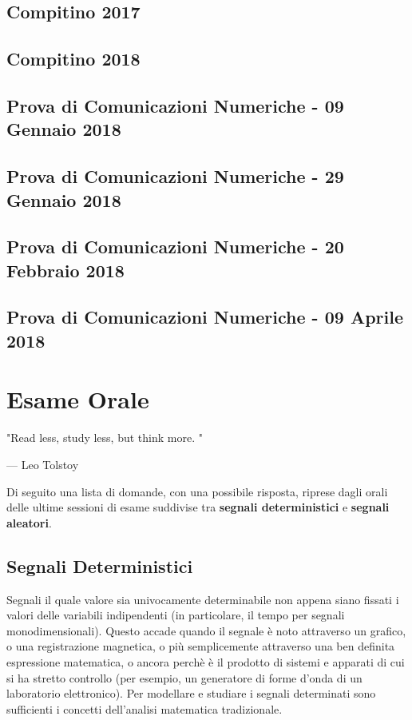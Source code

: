 \documentclass[12pt,oneside,openany]{memoir}
\numberwithin{equation}{subsection}
\begin{document}
\newpage
\section{Compitino 2017}

\newpage
\section{Compitino 2018}

\newpage
\section{Prova di Comunicazioni Numeriche - 09 Gennaio 2018}

\newpage
\section{Prova di Comunicazioni Numeriche - 29 Gennaio 2018}

\newpage
\section{Prova di Comunicazioni Numeriche - 20 Febbraio 2018}

\newpage
\section{Prova di Comunicazioni Numeriche - 09 Aprile 2018}


\chapter{Esame Orale}
\epigraph{"Read less, study less, but think more.	"}{--- \textup{Leo Tolstoy}}

Di seguito una lista di domande, con una possibile risposta, riprese dagli orali delle ultime sessioni di esame suddivise tra \textbf{segnali deterministici} e \textbf{segnali aleatori}.

\section{Segnali Deterministici}
Segnali il quale valore sia univocamente determinabile non appena siano fissati i valori delle variabili indipendenti (in particolare, il tempo per segnali monodimensionali). Questo accade quando il segnale \`e noto attraverso un grafico, o una registrazione magnetica, o pi\`u semplicemente attraverso una ben definita espressione matematica, o ancora perch\`e \`e il prodotto di sistemi e apparati di cui si ha stretto controllo (per esempio, un generatore di forme d'onda di un laboratorio elettronico).
Per modellare e studiare i segnali determinati sono sufficienti i concetti dell'analisi matematica tradizionale.
\end{document}
